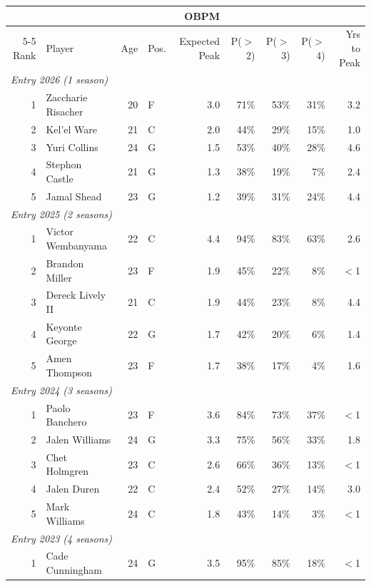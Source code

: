 \begin{table}[htbp]
  \centering\small
  \begin{tabular}{rlrlrrrrr}
    \toprule
     & & & & OBPM & & & & \\
    \cmidrule(lr){5-5}
    Rank & Player & Age & Pos. & Expected Peak & P($>$2) & P($>$3) & P($>$4) & Yrs to Peak \\
    \midrule
    \multicolumn{9}{l}{\textit{Entry 2026 (1 season)}} \\
    \midrule
    1 & Zaccharie Risacher & 20 & F & 3.0 & 71\% & 53\% & 31\% & 3.2 \\
    2 & Kel'el Ware & 21 & C & 2.0 & 44\% & 29\% & 15\% & 1.0 \\
    3 & Yuri Collins & 24 & G & 1.5 & 53\% & 40\% & 28\% & 4.6 \\
    4 & Stephon Castle & 21 & G & 1.3 & 38\% & 19\% & 7\% & 2.4 \\
    5 & Jamal Shead & 23 & G & 1.2 & 39\% & 31\% & 24\% & 4.4 \\
    \midrule[0.4pt]
    \multicolumn{9}{l}{\textit{Entry 2025 (2 seasons)}} \\
    \midrule
    1 & Victor Wembanyama & 22 & C & 4.4 & 94\% & 83\% & 63\% & 2.6 \\
    2 & Brandon Miller & 23 & F & 1.9 & 45\% & 22\% & 8\% & $<$1 \\
    3 & Dereck Lively II & 21 & C & 1.9 & 44\% & 23\% & 8\% & 4.4 \\
    4 & Keyonte George & 22 & G & 1.7 & 42\% & 20\% & 6\% & 1.4 \\
    5 & Amen Thompson & 23 & F & 1.7 & 38\% & 17\% & 4\% & 1.6 \\
    \midrule[0.4pt]
    \multicolumn{9}{l}{\textit{Entry 2024 (3 seasons)}} \\
    \midrule
    1 & Paolo Banchero & 23 & F & 3.6 & 84\% & 73\% & 37\% & $<$1 \\
    2 & Jalen Williams & 24 & G & 3.3 & 75\% & 56\% & 33\% & 1.8 \\
    3 & Chet Holmgren & 23 & C & 2.6 & 66\% & 36\% & 13\% & $<$1 \\
    4 & Jalen Duren & 22 & C & 2.4 & 52\% & 27\% & 14\% & 3.0 \\
    5 & Mark Williams & 24 & C & 1.8 & 43\% & 14\% & 3\% & $<$1 \\
    \midrule[0.4pt]
    \multicolumn{9}{l}{\textit{Entry 2023 (4 seasons)}} \\
    \midrule
    1 & Cade Cunningham & 24 & G & 3.5 & 95\% & 85\% & 18\% & $<$1 \\

\end{tabular}
\end{table}
